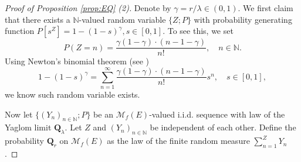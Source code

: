 \documentclass[12pt,a4paper]{amsart}
\numberwithin{equation}{section}
\theoremstyle{plain}
\theoremstyle{definition}
\theoremstyle{remark}
\begin{document}
\begin{proof}[Proof of Proposition \ref{prop:EQ} (2)]
	Denote by $\gamma = r / \lambda \in (0,1)$. 
	We first claim that there exists a $\mathbb N$-valued random variable $\{Z;P\}$ with probability generating function $P[s^Z] = 1 - (1- s)^{\gamma}, s\in [0,1]$. To see this, we set
	\[
	P(Z = n) = \frac{\gamma(1-\gamma ) \cdot (n-1-\gamma  )}{n!}, \quad n \in \mathbb N.
	\]
	Using Newton's binomial theorem (see \cite[Exercise 8.22]{Rudin1976Principles})
	\[
	1 - (1 - s)^\gamma = \sum_{n = 1}^\infty \frac{\gamma (1-\gamma)\cdot (n-1-\gamma )}{n!} s^n, \quad s\in [0,1],
	\]
	we know such random variable exists.
	
	Now let $\{(Y_n)_{n \in \mathbb N}; P\}$ be an $\mathcal M_f(E)$-valued i.i.d. sequence with law of the Yaglom limit $\mathbf Q_\lambda$.
	Let $Z$ and $(Y_n)_{n\in \mathbb N}$ be independent of each other.
	Define the probability $\mathbf Q_r$ on $\mathcal M_f(E)$ as the law of the finite random measure $\sum_{n=1}^Z Y_n$.
	

\end{proof}
\end{document}
